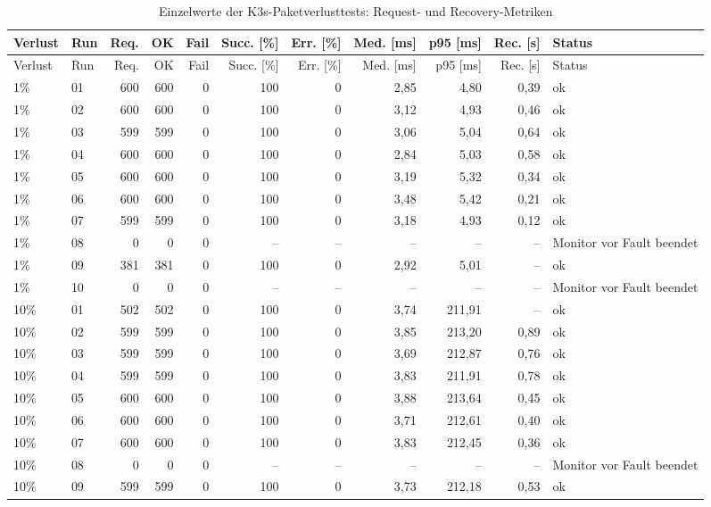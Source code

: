 \begin{longtable}{llrrrrrrrrl}
\caption{Einzelwerte der K3s-Paketverlusttests: Request- und Recovery-Metriken}\label{tab:appendix-k3s-packet-loss-requests}\\
\toprule
Verlust & Run & Req. & OK & Fail & Succ. [\%] & Err. [\%] & Med. [ms] & p95 [ms] & Rec. [s] & Status \\
\midrule
\endfirsthead
\toprule
Verlust & Run & Req. & OK & Fail & Succ. [\%] & Err. [\%] & Med. [ms] & p95 [ms] & Rec. [s] & Status \\
\midrule
\endhead
1\% & 01 & 600 & 600 & 0 & 100 & 0 & 2,85 & 4,80 & 0,39 & ok \\
1\% & 02 & 600 & 600 & 0 & 100 & 0 & 3,12 & 4,93 & 0,46 & ok \\
1\% & 03 & 599 & 599 & 0 & 100 & 0 & 3,06 & 5,04 & 0,64 & ok \\
1\% & 04 & 600 & 600 & 0 & 100 & 0 & 2,84 & 5,03 & 0,58 & ok \\
1\% & 05 & 600 & 600 & 0 & 100 & 0 & 3,19 & 5,32 & 0,34 & ok \\
1\% & 06 & 600 & 600 & 0 & 100 & 0 & 3,48 & 5,42 & 0,21 & ok \\
1\% & 07 & 599 & 599 & 0 & 100 & 0 & 3,18 & 4,93 & 0,12 & ok \\
1\% & 08 & 0 & 0 & 0 & -- & -- & -- & -- & -- & Monitor vor Fault beendet \\
1\% & 09 & 381 & 381 & 0 & 100 & 0 & 2,92 & 5,01 & -- & ok \\
1\% & 10 & 0 & 0 & 0 & -- & -- & -- & -- & -- & Monitor vor Fault beendet \\
10\% & 01 & 502 & 502 & 0 & 100 & 0 & 3,74 & 211,91 & -- & ok \\
10\% & 02 & 599 & 599 & 0 & 100 & 0 & 3,85 & 213,20 & 0,89 & ok \\
10\% & 03 & 599 & 599 & 0 & 100 & 0 & 3,69 & 212,87 & 0,76 & ok \\
10\% & 04 & 599 & 599 & 0 & 100 & 0 & 3,83 & 211,91 & 0,78 & ok \\
10\% & 05 & 600 & 600 & 0 & 100 & 0 & 3,88 & 213,64 & 0,45 & ok \\
10\% & 06 & 600 & 600 & 0 & 100 & 0 & 3,71 & 212,61 & 0,40 & ok \\
10\% & 07 & 600 & 600 & 0 & 100 & 0 & 3,83 & 212,45 & 0,36 & ok \\
10\% & 08 & 0 & 0 & 0 & -- & -- & -- & -- & -- & Monitor vor Fault beendet \\
10\% & 09 & 599 & 599 & 0 & 100 & 0 & 3,73 & 212,18 & 0,53 & ok \\

\end{longtable}
